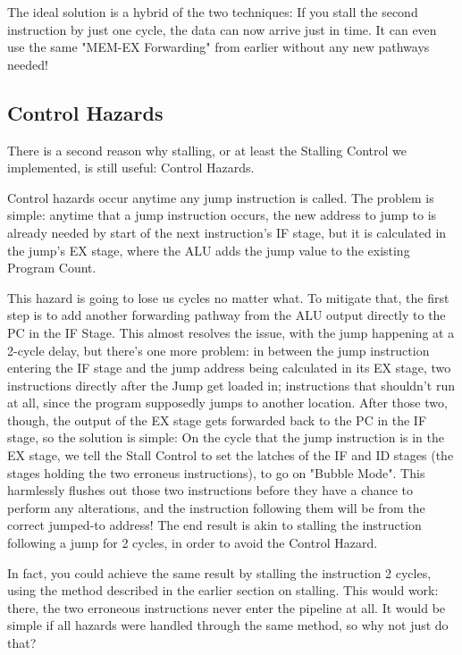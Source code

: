 \documentclass[12pt,twoside]{reedthesis}
\begin{document}
The ideal solution is a hybrid of the two techniques: If you stall the second instruction by just one cycle, the data can now arrive just in time. It can even use the same "MEM-EX Forwarding" from earlier without any new pathways needed!

\subsection{Control Hazards}

There is a second reason why stalling, or at least the Stalling Control we implemented, is still useful: Control Hazards.

Control hazards occur anytime any jump instruction is called. The problem is simple: anytime that a jump instruction occurs, the new address to jump to is already needed by start of the next instruction's IF stage, but it is calculated in the jump's EX stage, where the ALU adds the jump value to the existing Program Count.

This hazard is going to lose us cycles no matter what. To mitigate that, the first step is to add another forwarding pathway from the ALU output directly to the PC in the IF Stage.
This almost resolves the issue, with the jump happening at a 2-cycle delay, but there's one more problem: in between the  jump instruction entering the IF stage and the jump address being calculated in its EX stage, two instructions directly after the Jump get loaded in; instructions that shouldn't run at all, since the program supposedly jumps to another location. After those two, though, the output of the EX stage gets forwarded back to the PC in the IF stage, so the solution is simple: On the cycle that the jump instruction is in the EX stage, we tell the Stall Control to set the latches of the IF and ID stages (the stages holding the two erroneus instructions), to go on "Bubble Mode". This harmlessly flushes out those two instructions before they have a chance to perform any alterations, and the instruction following them will be from the correct jumped-to address! The end result is akin to stalling the instruction following a jump for 2 cycles, in order to avoid the Control Hazard.

In fact, you could achieve the same result by stalling the instruction 2 cycles, using the method described in the earlier section on stalling. This would work: there, the two erroneous instructions never enter the pipeline at all. It would be simple if all hazards were handled through the same method, so why not just do that?
\end{document}
